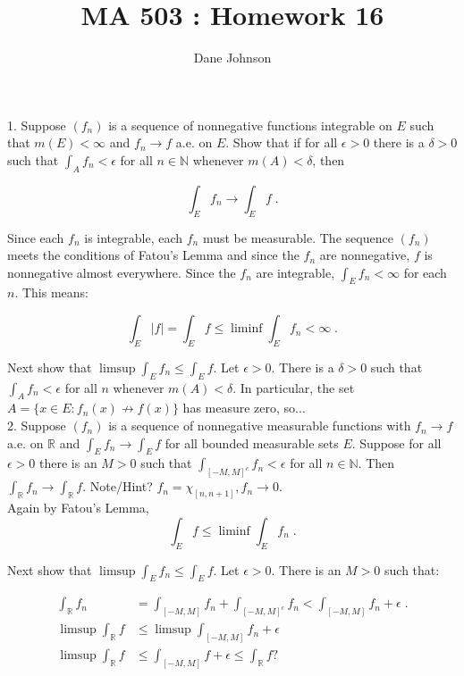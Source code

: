 \documentclass[a4paper]{article}
\title{MA 503 : Homework 16}
\author{Dane Johnson}
\begin{document}
\maketitle

1. Suppose $(f_n)$ is a sequence of nonnegative functions integrable on $E$ such that $m(E) < \infty$ and $ f_n \rightarrow  f$ a.e. on $E$. Show that if for all $\epsilon > 0$ there is a $\delta > 0$ such that $\int_A f_n < \epsilon$ for all $n \in \mathbb{N}$ whenever $m(A) < \delta$, then 

$$\int_E f_n \rightarrow \int_E f \;.$$

Since each $f_n$ is integrable, each $f_n$ must be measurable. The sequence $(f_n)$ meets the conditions of Fatou's Lemma and since the $f_n$ are nonnegative, $f$ is nonnegative almost everywhere. Since the $f_n$ are integrable, $\int_E f_n < \infty$ for each $n$. This means:

$$\int_E |f| = \int_E f \leq \liminf \int_E f_n < \infty \;.$$

Next show that $\limsup \int_E f_n \leq \int_E f$. Let $\epsilon > 0$. There is a $\delta > 0$ such that $\int_A f_n < \epsilon$ for all $n$ whenever $m(A) < \delta$. In particular, the set $A = \{x \in E : f_n(x) \not\rightarrow f(x) \}$ has measure zero, so...\\

2. Suppose $(f_n)$ is a sequence of nonnegative measurable functions with $f_n \rightarrow f$ a.e. on $\mathbb{R}$ and $\int_E f_n \rightarrow \int_E f$ for all bounded measurable sets $E$. Suppose for all $\epsilon > 0$ there is an $M > 0$ such that $\int_{[-M,M]^c} f_n < \epsilon$ for all $n \in \mathbb{N}$. Then $\int_{\mathbb{R}} f_n \rightarrow \int_{\mathbb{R}} f$. Note/Hint? $f_n = \chi_{[n,n+1]}, f_n \rightarrow 0$.\\

Again by Fatou's Lemma,
$$\int_E f \leq \liminf \int_E f_n \;.$$

Next show that $\limsup \int_E f_n \leq \int_E f$. Let $\epsilon > 0$. There is an $M > 0$ such that:

\begin{align*}
\int_{\mathbb{R}} f_n &= \int_{[-M,M]} f_n + \int_{[-M,M]^c} f_n < \int_{[-M,M]} f_n + \epsilon \;. \\
\limsup \int_{\mathbb{R}} f &\leq \limsup \int_{[-M,M]} f_n + \epsilon\\
\limsup \int_{\mathbb{R}} f &\leq \int_{[-M,M]} f + \epsilon \leq \int_{\mathbb{R}} f ?\\
\end{align*}
\end{document}
